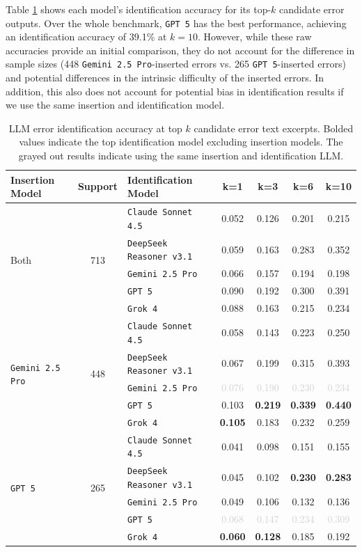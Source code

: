 \documentclass{article}
\newcommand{\gemini}{\texttt{Gemini 2.5 Pro}}
\newcommand{\gpt}{\texttt{GPT 5}}
\newcommand{\grok}{\texttt{Grok 4}}
\newcommand{\deepseek}{\texttt{DeepSeek Reasoner v3.1}}
\newcommand{\claude}{\texttt{Claude Sonnet 4.5}}
\begin{document}
Table \ref{table:identification_results} shows each model's identification accuracy for its top-$k$ candidate error outputs. Over the whole benchmark, \gpt{} has the best performance, achieving an identification accuracy of 39.1\% at $k=10$. However, while these raw accuracies provide an initial comparison, they do not account for the difference in sample sizes (448 \gemini{}-inserted errors vs. 265 \gpt{}-inserted errors) and potential differences in the intrinsic difficulty of the inserted errors. In addition, this also does not account for potential bias in identification results if we use the same insertion and identification model.

\begin{table}[t]
\centering
\begin{tabular}{lclcccc}
\hline
\textbf{Insertion Model} &\textbf{Support} & \textbf{Identification Model} & \textbf{k=1} & \textbf{k=3} & \textbf{k=6} & \textbf{k=10}\\
\hline
\multirow{5}{*}{Both}&\multirow{5}{*}{713}&\claude{} & 0.052 & 0.126 & 0.201 & 0.215 \\
&&\deepseek{} & 0.059 & 0.163 & 0.283 & 0.352 \\
&&\gemini{} & 0.066& 0.157 & 0.194 & 0.198 \\
&&\gpt{} & 0.090 & 0.192 & 0.300 & 0.391 \\
&&\grok{} & 0.088 & 0.163 & 0.215 & 0.234 \\
\hline
\multirow{5}{*}{\gemini{}} &\multirow{5}{*}{448}& \claude{} & 0.058 & 0.143 & 0.223 & 0.250\\
&& \deepseek{} & 0.067 & 0.199 & 0.315 & 0.393\\
&& \gemini{} & \textcolor{lightgray}{0.076} & \textcolor{lightgray}{0.190} & \textcolor{lightgray}{0.230} & \textcolor{lightgray}{0.234}\\
&& \gpt{} & 0.103 & \textbf{0.219} & \textbf{0.339} & \textbf{0.440}\\
&& \grok{} & \textbf{0.105} & 0.183 & 0.232 & 0.259\\
\hline
\multirow{5}{*}{\gpt{}} & \multirow{5}{*}{265}&\claude{} & 0.041 & 0.098 & 0.151 & 0.155 \\
&& \deepseek{} & 0.045 & 0.102 & \textbf{0.230} & \textbf{0.283} \\
&& \gemini{} & 0.049& 0.106 & 0.132 & 0.136 \\
&& \gpt{} &\textcolor{lightgray}{0.068} & \textcolor{lightgray}{0.147} & \textcolor{lightgray}{0.234} & \textcolor{lightgray}{0.309} \\
&& \grok{} & \textbf{0.060} & \textbf{0.128} & 0.185 & 0.192 \\
\hline
\end{tabular}
\caption{LLM error identification accuracy at top $k$ candidate error text excerpts. Bolded values indicate the top identification model excluding insertion models. The grayed out results indicate using the same insertion and identification LLM.}
\label{table:identification_results}
\end{table}
\end{document}
